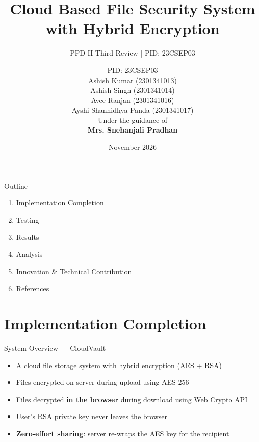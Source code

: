 \documentclass{SKP-beamer}
\title[Cloud File Security]{Cloud Based File Security System with Hybrid Encryption}
\subtitle{PPD-II Third Review \hspace{0.3cm} | \hspace{0.3cm} PID: 23CSEP03}
\author[23CSEP03]{PID: 23CSEP03 \\[0.3cm] \small{Ashish Kumar (2301341013)} \\[0.1cm] \small{Ashish Singh (2301341014)} \\[0.1cm] \small{Avee Ranjan (2301341016)} \\[0.1cm] \small{Ayshi Shannidhya Panda (2301341017)} \\[0.3cm] \small{Under the guidance of} \\ \textbf{Mrs. Snehanjali Pradhan}}
\institute[SIT]{
  Silicon Institute of Technology
}
\date{November 2026}
\begin{document}
\begin{frame}
  \titlepage
\end{frame}

\begin{frame}{Outline}
\begin{enumerate}
  \item Implementation Completion
  \item Testing
  \item Results
  \item Analysis
  \item Innovation \& Technical Contribution
  \item References
\end{enumerate}
\end{frame}

\section{Implementation Completion}

\begin{frame}{System Overview --- CloudVault}
\begin{itemize}
  \item A cloud file storage system with \alert{hybrid encryption} (AES + RSA)
  \item Files encrypted on server during upload using AES-256
  \item Files decrypted \textbf{in the browser} during download using Web Crypto API
  \item User's RSA private key \alert{never leaves the browser}
  \item \textbf{Zero-effort sharing}: server re-wraps the AES key for the recipient
\end{itemize}
\end{frame}
\end{document}
